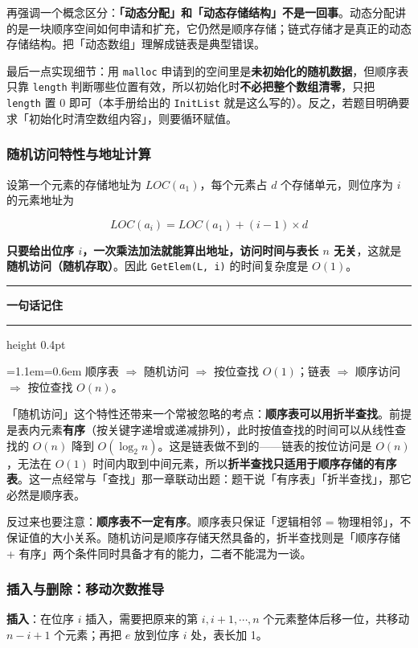 \documentclass[11pt,openany,UTF8]{ctexbook}
\newcommand{\callouthead}[2]{%
  \par\addvspace{7pt}\noindent
  {\color{#1}\rule[-0.15em]{3pt}{1.05em}}\hspace{0.5em}%
  {\bfseries\color{#1}#2}\par\nobreak\vspace{-0.35em}%
  {\color{rulesep}\hrule height 0.4pt}\nobreak\vspace{0.45em}%
  \begingroup\small\setlength{\parindent}{0pt}%
  \leftskip=1.1em\rightskip=0.6em\noindent\ignorespaces}
\newcommand{\calloutend}{\par\endgroup\addvspace{7pt}}
\newenvironment{callkey}[1]{\callouthead{keybar}{#1}}{\calloutend}
\begin{document}
再强调一个概念区分：\textbf{「动态分配」和「动态存储结构」不是一回事}。动态分配讲的是一块顺序空间如何申请和扩充，它仍然是顺序存储；链式存储才是真正的动态存储结构。把「动态数组」理解成链表是典型错误。

最后一点实现细节：用 \texttt{malloc} 申请到的空间里是\textbf{未初始化的随机数据}，但顺序表只靠 \texttt{length} 判断哪些位置有效，所以初始化时\textbf{不必把整个数组清零}，只把 \texttt{length} 置 0 即可（本手册给出的 \texttt{InitList} 就是这么写的）。反之，若题目明确要求「初始化时清空数组内容」，则要循环赋值。

\subsubsection{随机访问特性与地址计算}

设第一个元素的存储地址为 $LOC(a_1)$，每个元素占 $d$ 个存储单元，则位序为 $i$ 的元素地址为

\[LOC(a_i) = LOC(a_1) + (i-1) \times d\]

\textbf{只要给出位序 $i$，一次乘法加法就能算出地址，访问时间与表长 $n$ 无关}，这就是\textbf{随机访问（随机存取）}。因此 \texttt{GetElem(L,\allowbreak{} i)\allowbreak{}} 的时间复杂度是 $O(1)$。

\begin{callkey}{一句话记住}
顺序表 $\Rightarrow$ 随机访问 $\Rightarrow$ 按位查找 $O(1)$；链表 $\Rightarrow$ 顺序访问 $\Rightarrow$ 按位查找 $O(n)$。

\end{callkey}

「随机访问」这个特性还带来一个常被忽略的考点：\textbf{顺序表可以用折半查找}。前提是表内元素\textbf{有序}（按关键字递增或递减排列），此时按值查找的时间可以从线性查找的 $O(n)$ 降到 $O(\log_2 n)$。这是链表做不到的——链表的按位访问是 $O(n)$，无法在 $O(1)$ 时间内取到中间元素，所以\textbf{折半查找只适用于顺序存储的有序表}。这一点经常与「查找」那一章联动出题：题干说「有序表」「折半查找」，那它必然是顺序表。

反过来也要注意：\textbf{顺序表不一定有序}。顺序表只保证「逻辑相邻 = 物理相邻」，不保证值的大小关系。随机访问是顺序存储天然具备的，折半查找则是「顺序存储 + 有序」两个条件同时具备才有的能力，二者不能混为一谈。

\subsubsection{插入与删除：移动次数推导}

\textbf{插入}：在位序 $i$ 插入，需要把原来的第 $i, i+1, \cdots, n$ 个元素整体后移一位，共移动 $n-i+1$ 个元素；再把 $e$ 放到位序 $i$ 处，表长加 1。
\end{document}
